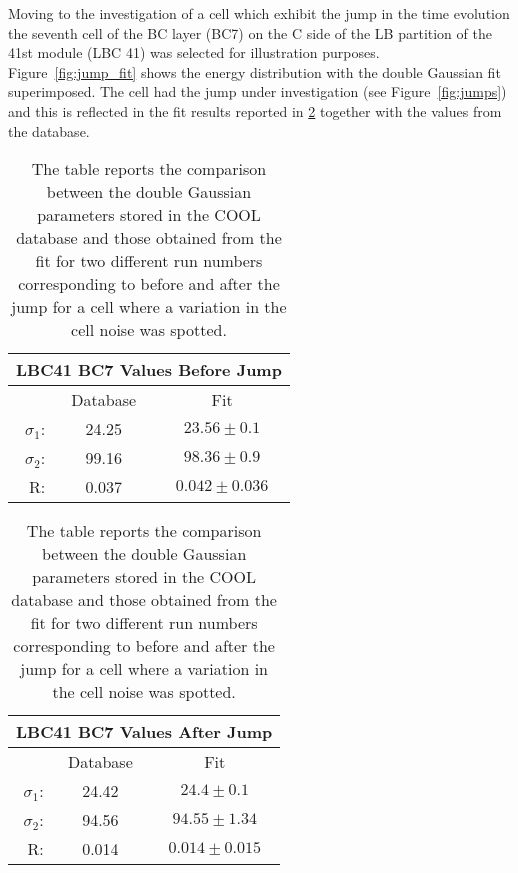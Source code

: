 Moving to the investigation of a cell which exhibit the jump in the time
evolution the seventh cell of the BC layer (BC7) on the C side of the LB
partition of the 41st module (LBC 41) was selected for illustration purposes.
Figure~\ref{fig:jump_fit} shows the energy distribution with the double Gaussian
fit superimposed. The cell had the jump under investigation (see
Figure~\ref{fig:jumps}) and this is reflected in the fit results reported in
\cref{tab:jump_fit} together with the values from the database.
\begin{table}[!h]
  \centering
  \begin{tabular}{r c c}
    \toprule
    \multicolumn{3}{c}{LBC41 BC7 Values Before Jump} \\
    \midrule \midrule
    \quad & Database  & Fit \\
    \midrule
    $\sigma_1$: & 24.25  & $23.56 \pm 0.1$ \\
    $\sigma_2$: & 99.16 & $98.36 \pm 0.9$ \\
    R\@: & 0.037  & $0.042 \pm 0.036$ \\
    \bottomrule
  \end{tabular} \quad
  \begin{tabular}{r c c}
    \toprule
    \multicolumn{3}{c}{LBC41 BC7 Values After Jump} \\
    \midrule \midrule
    \quad & Database & Fit \\
    \midrule
    $\sigma_1$: & 24.42 & $24.4 \pm 0.1$ \\
    $\sigma_2$: & 94.56 & $94.55 \pm 1.34$ \\
    R\@: & 0.014 & $0.014 \pm 0.015$ \\
    \bottomrule
  \end{tabular}
  \caption{The table reports the comparison between the double Gaussian
    parameters stored in the COOL database and those obtained from the
    fit for two different run numbers corresponding to before and after the
    jump for a cell where a variation in the cell noise was spotted.}
  \label{tab:jump_fit}
\end{table}

